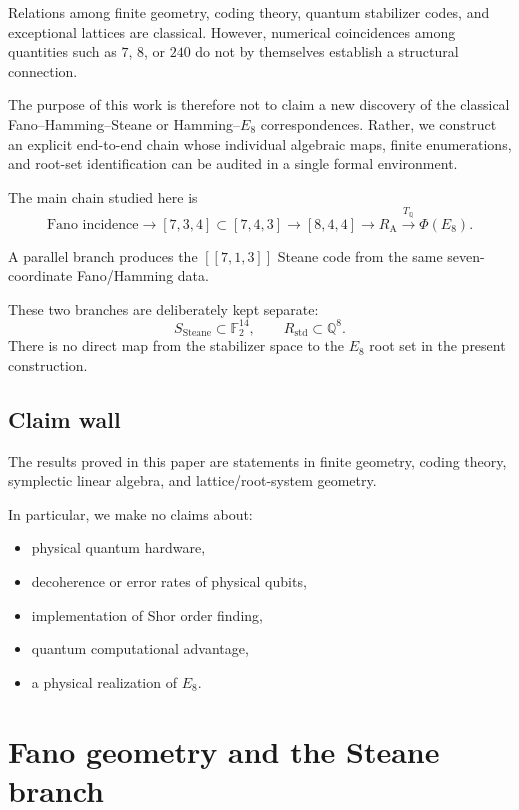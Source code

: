 \documentclass[11pt,a4paper]{article}
\theoremstyle{definition}
\theoremstyle{remark}
\newcommand{\F}{\mathbb F}
\newcommand{\Q}{\mathbb Q}
\newcommand{\RA}{R_{\mathrm A}}
\newcommand{\Rstd}{R_{\mathrm{std}}}
\newcommand{\TQ}{T_{\mathbb Q}}
\begin{document}
	Relations among finite geometry, coding theory, quantum stabilizer codes, and
	exceptional lattices are classical.  However, numerical coincidences among
	quantities such as $7$, $8$, or $240$ do not by themselves establish a
	structural connection.
	
	The purpose of this work is therefore not to claim a new discovery of the
	classical Fano--Hamming--Steane or Hamming--$E_8$ correspondences.  Rather,
	we construct an explicit end-to-end chain whose individual algebraic maps,
	finite enumerations, and root-set identification can be audited in a single
	formal environment.
	
	The main chain studied here is
	\[
	\text{Fano incidence}
	\longrightarrow
	[7,3,4]\subset[7,4,3]
	\longrightarrow
	[8,4,4]
	\longrightarrow
	\RA
	\overset{\TQ}{\longrightarrow}
	\Phi(E_8).
	\]
	
	A parallel branch produces the $[[7,1,3]]$ Steane code from the same
	seven-coordinate Fano/Hamming data.
	
	These two branches are deliberately kept separate:
	\[
	S_{\mathrm{Steane}}\subset\F_2^{14},
	\qquad
	\Rstd\subset\Q^8.
	\]
	There is no direct map from the stabilizer space to the $E_8$ root set in
	the present construction.
	
	\subsection*{Claim wall}
	
	The results proved in this paper are statements in finite geometry, coding
	theory, symplectic linear algebra, and lattice/root-system geometry.
	
	In particular, we make no claims about:
	\begin{itemize}[nosep]
		\item physical quantum hardware,
		\item decoherence or error rates of physical qubits,
		\item implementation of Shor order finding,
		\item quantum computational advantage,
		\item a physical realization of $E_8$.
	\end{itemize}
	
	\section{Fano geometry and the Steane branch}
	
\end{document}
